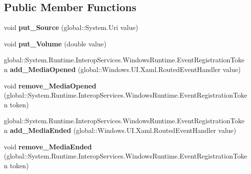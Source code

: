 \subsection*{Public Member Functions}
\begin{DoxyCompactItemize}
\item 
\mbox{\label{class_windows_1_1_u_i_1_1_xaml_1_1_controls_1_1_media_element_a77693f63ab1d7f17c1bfdb8485060b5e}} 
void {\bfseries put\+\_\+\+Source} (global\+::\+System.\+Uri value)
\item 
\mbox{\label{class_windows_1_1_u_i_1_1_xaml_1_1_controls_1_1_media_element_a60fda18e747d6812a8974f7e5eb410d8}} 
void {\bfseries put\+\_\+\+Volume} (double value)
\item 
\mbox{\label{class_windows_1_1_u_i_1_1_xaml_1_1_controls_1_1_media_element_ae9f2b87ec2a650cb63f183d1dcc1a22a}} 
global\+::\+System.\+Runtime.\+Interop\+Services.\+Windows\+Runtime.\+Event\+Registration\+Token {\bfseries add\+\_\+\+Media\+Opened} (global\+::\+Windows.\+U\+I.\+Xaml.\+Routed\+Event\+Handler value)
\item 
\mbox{\label{class_windows_1_1_u_i_1_1_xaml_1_1_controls_1_1_media_element_aab5909e1ff93dfda5b52b5fa11abed8d}} 
void {\bfseries remove\+\_\+\+Media\+Opened} (global\+::\+System.\+Runtime.\+Interop\+Services.\+Windows\+Runtime.\+Event\+Registration\+Token token)
\item 
\mbox{\label{class_windows_1_1_u_i_1_1_xaml_1_1_controls_1_1_media_element_a8aa6be4d55d568bf901e9d19f1b5ba5e}} 
global\+::\+System.\+Runtime.\+Interop\+Services.\+Windows\+Runtime.\+Event\+Registration\+Token {\bfseries add\+\_\+\+Media\+Ended} (global\+::\+Windows.\+U\+I.\+Xaml.\+Routed\+Event\+Handler value)
\item 
\mbox{\label{class_windows_1_1_u_i_1_1_xaml_1_1_controls_1_1_media_element_a67a8ce04e034477b3b3042593f1a0009}} 
void {\bfseries remove\+\_\+\+Media\+Ended} (global\+::\+System.\+Runtime.\+Interop\+Services.\+Windows\+Runtime.\+Event\+Registration\+Token token)

\end{DoxyCompactItemize}
